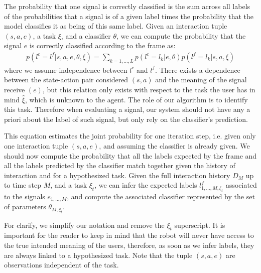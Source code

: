 The probability that one signal is correctly classified is the sum across all labels of the probabilities that a signal is of a given label times the probability that the model classifies it as being of this same label. Given an interaction tuple $(s,a,e)$, a task $\xi$, and a classifier $\theta$, we can compute the probability that the signal $e$ is correctly classified according to the frame as:
%
\begin{eqnarray}
p(l^c = l^f | s, a, e, \theta, \xi) = \sum_{k = 1, \ldots, L} p(l^c = l_k | e, \theta) p(l^f = l_k | s, a, \xi)
\end{eqnarray}
%
where we assume independence between $l^c$ and $l^f$. There exists a dependence between the state-action pair considered $(s,a)$ and the meaning of the signal receive $(e)$, but this relation only exists with respect to the task the user has in mind $\hat{\xi}$, which is unknown to the agent. The role of our algorithm is to identify this task. Therefore when evaluating a signal, our system should not have any a priori about the label of such signal, but only rely on the classifier's prediction.

This equation estimates the joint probability for one iteration step, i.e. given only one interaction tuple $(s,a,e)$, and assuming the classifier is already given. We should now compute the probability that all the labels expected by the frame and all the labels predicted by the classifier match together given the history of interaction and for a hypothesized task. Given the full interaction history $D_M$ up to time step $M$, and a task $\xi_t$, we can infer the expected labels $l^f_{1,\ldots,M, \xi_t}$ associated to the signals $e_{1,\ldots,M}$, and compute the associated classifier represented by the set of parameters $\theta_{M, \xi_t}$.

For clarify, we simplify our notation and remove the $\xi_t$ superscript. It is important for the reader to keep in mind that the robot will never have access to the true intended meaning of the users, therefore, as soon as we infer labels, they are always linked to a hypothesized task. Note that the tuple $(s, a, e)$ are observations independent of the task.

